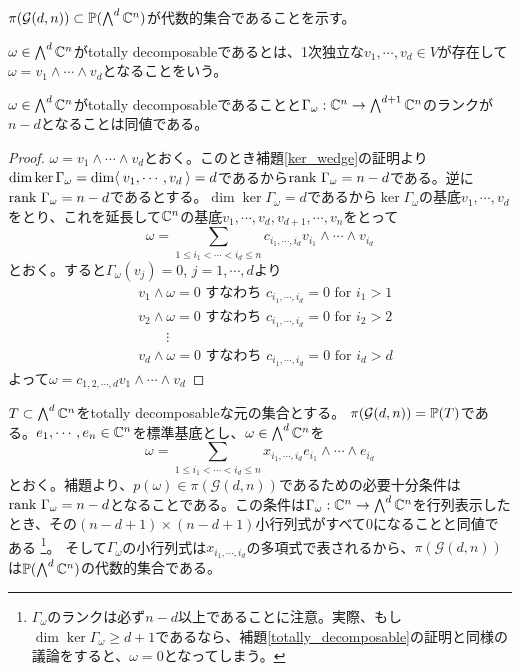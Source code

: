 \documentclass{ltjsreport}
\begin{document}
$\pi(\mathcal{G}(d,n))\subset\mathbb{P}(\bigwedge^d\mathbb{C}^n)$が代数的集合であることを示す。

\begin{defin}
  $\omega\in\bigwedge^d \mathbb{C}^n$がtotally decomposableであるとは、1次独立な$v_1,\cdots,v_d\in V$が存在して$\omega=v_1\wedge\cdots\wedge v_d$となることをいう。
\end{defin}

\begin{lemm}\label{totally_decomposable}
  $\omega\in\bigwedge^d \mathbb{C}^n$がtotally decomposableであることと$\Gamma_\omega:\mathbb{C}^n\rightarrow\bigwedge^{d+1}\mathbb{C}^n$のランクが$n-d$となることは同値である。
\end{lemm}

\begin{proof}
  $\omega=v_1\wedge\cdots\wedge v_d$とおく。このとき補題\ref{ker_wedge}の証明より$\dim\ker\Gamma_\omega=\dim \langle\:v_1,\cdots,v_d\:\rangle=d$であるから$\text{rank }\Gamma_\omega=n-d$である。逆に$\text{rank }\Gamma_\omega=n-d$であるとする。$\dim\ker\Gamma_\omega=d$であるから$\ker\Gamma_\omega$の基底$v_1,\cdots,v_d$をとり、これを延長して$\mathbb{C}^n$の基底$v_1,\cdots,v_d,v_{d+1},\cdots,v_n$をとって
  \[
  \omega=\sum_{1\leq i_1<\cdots<i_d\leq n}c_{i_1,\cdots,i_d}v_{i_1}\wedge\cdots\wedge v_{i_d}  
  \]
  とおく。すると$\Gamma_\omega(v_j)=0$, $j=1,\cdots,d$より
  \begin{align*}
    &v_1\wedge\omega=0\text{ すなわち } c_{i_1,\cdots,i_d}=0\text{ for } i_1 > 1\\
    &v_2\wedge\omega=0\text{ すなわち } c_{i_1,\cdots,i_d}=0\text{ for }i_2 > 2\\
    &\qquad\vdots\\
    &v_d\wedge\omega=0\text{ すなわち } c_{i_1,\cdots,i_d}=0\text{ for }i_d > d
  \end{align*}
  よって$\omega=c_{1,2,\cdots,d}v_1\wedge\cdots\wedge v_d$
\end{proof}


$T\subset\bigwedge^d\mathbb{C}^n$をtotally decomposableな元の集合とする。
$\pi(\mathcal{G}(d,n))=\mathbb{P}(T)$である。$e_1,\cdots,e_n\in \mathbb{C}^n$を標準基底とし、$\omega\in\bigwedge^d\mathbb{C}^n$を
\[
\omega=\sum_{1\leq i_1<\cdots<i_d\leq n}x_{i_1,\cdots,i_d}e_{i_1}\wedge\cdots\wedge e_{i_d}  
\]
とおく。補題より、$p(\omega)\in\pi(\mathcal{G}(d,n))$であるための必要十分条件は$\text{rank }\Gamma_\omega=n-d$となることである。この条件は$\Gamma_\omega:\mathbb{C}^n\rightarrow \bigwedge^d\mathbb{C}^n$を行列表示したとき、その$(n-d+1)\times(n-d+1)$小行列式がすべて$0$になることと同値である
\footnote{
  $\Gamma_\omega$のランクは必ず$n-d$以上であることに注意。実際、もし$\dim\ker\Gamma_{\omega}\geq d+1$であるなら、補題\ref{totally_decomposable}の証明と同様の議論をすると、$\omega=0$となってしまう。
}。
そして$\Gamma_\omega$の小行列式は$x_{i_1,\cdots,i_d}$の多項式で表されるから、$\pi(\mathcal{G}(d,n))$は$\mathbb{P}({\bigwedge^d\mathbb{C}^n})$の代数的集合である。
\end{document}
